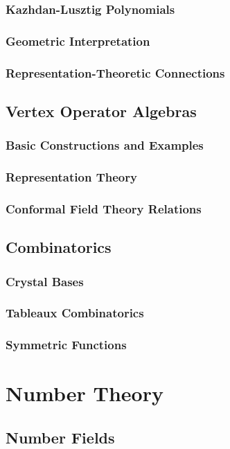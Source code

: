 \documentclass[12pt]{article}
\begin{document}
\subsubsection{Kazhdan-Lusztig Polynomials}
\subsubsection{Geometric Interpretation}
\subsubsection{Representation-Theoretic Connections}

\subsection{Vertex Operator Algebras}
\subsubsection{Basic Constructions and Examples}
\subsubsection{Representation Theory}
\subsubsection{Conformal Field Theory Relations}

\subsection{Combinatorics}
\subsubsection{Crystal Bases}
\subsubsection{Tableaux Combinatorics}
\subsubsection{Symmetric Functions}

\section{Number Theory}

\subsection{Number Fields}
\end{document}
